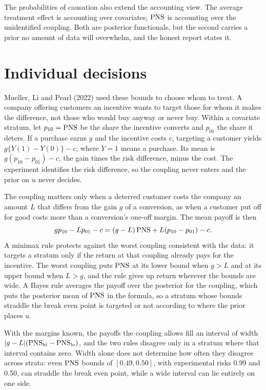 The probabilities of causation also extend the accounting view. The average treatment effect is accounting over covariates; $\mathrm{PNS}$ is accounting over the unidentified coupling. Both are posterior functionals, but the second carries a prior no amount of data will overwhelm, and the honest report states it.

\section{Individual decisions}\label{sec:decisions}

Mueller, Li and Pearl (2022) used these bounds to choose whom to treat. A company offering customers an incentive wants to target those for whom it makes the difference, not those who would buy anyway or never buy. Within a covariate stratum, let $p_{10} = \mathrm{PNS}$ be the share the incentive converts and $p_{01}$ the share it deters. If a purchase earns $g$ and the incentive costs $c$, targeting a customer yields $g\{Y(1) - Y(0)\} - c$, where $Y = 1$ means a purchase. Its mean is $g(p_{10} - p_{01}) - c$, the gain times the risk difference, minus the cost. The experiment identifies the risk difference, so the coupling never enters and the prior on $u$ never decides.

The coupling matters only when a deterred customer costs the company an amount $L$ that differs from the gain $g$ of a conversion, as when a customer put off for good costs more than a conversion's one-off margin. The mean payoff is then
\[
g p_{10} - L p_{01} - c = (g - L)\,\mathrm{PNS} + L(p_{10} - p_{01}) - c.
\]
A minimax rule protects against the worst coupling consistent with the data: it targets a stratum only if the return at that coupling already pays for the incentive. The worst coupling puts $\mathrm{PNS}$ at its lower bound when $g > L$ and at its upper bound when $L > g$, and the rule gives up return wherever the bounds are wide. A Bayes rule averages the payoff over the posterior for the coupling, which puts the posterior mean of $\mathrm{PNS}$ in the formula, so a stratum whose bounds straddle the break even point is targeted or not according to where the prior places $u$.

With the margins known, the payoffs the coupling allows fill an interval of width $|g - L|(\mathrm{PNS}_{\mathrm{hi}} - \mathrm{PNS}_{\mathrm{lo}})$, and the two rules disagree only in a stratum where that interval contains zero. Width alone does not determine how often they disagree across strata: even $\mathrm{PNS}$ bounds of $[0.49, 0.50]$, with experimental risks 0.99 and 0.50, can straddle the break even point, while a wide interval can lie entirely on one side.

